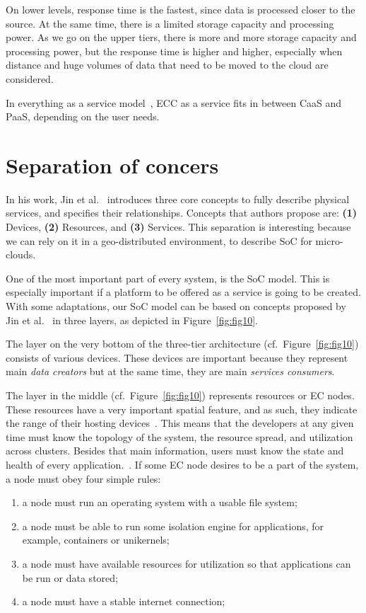 \noindent
On lower levels, response time is the fastest, since data is processed closer to the source. At the same time, there is a limited storage capacity and processing power. As we go on the upper tiers, there is more and more storage capacity and processing power, but the response time is higher and higher, especially when distance and huge volumes of data that need to be moved to the cloud are considered.

In everything as a service model~\cite{DuanFZSNH15}, ECC as a service fits in between CaaS and PaaS, depending on the user needs. 
%
%
\section{Separation of concers}\label{sec:separation_of_concerns}
%
In his work, Jin et al.~\cite{JinCJL14} introduces three core concepts to fully describe physical services, and specifies their relationships. Concepts that authors propose are: \textbf{(1)} Devices, \textbf{(2)} Resources, and \textbf{(3)} Services. This separation is interesting because we can rely on it in a geo-distributed environment, to describe SoC for micro-clouds.

One of the most important part of every system, is the SoC model. This is especially important if a platform to be offered as a service is going to be created. With some adaptations, our SoC model can be based on concepts proposed by Jin et al.~\cite{JinCJL14} in three layers, as depicted in Figure~\ref{fig:fig10}. 

The layer on the very bottom of the three-tier architecture (cf.~Figure~\ref{fig:fig10}) consists of various devices. These devices are important because they represent main \textit{data creators} but at the same time, they are main \textit{services consumers}. 

The layer in the middle (cf.~Figure~\ref{fig:fig10}) represents resources or EC nodes. These resources have a very important spatial feature, and as such, they indicate the range of their hosting devices~\cite{JinCJL14}. This means that the developers at any given time must know the topology of the system, the resource spread, and utilization across clusters. Besides that main information, users must know the state and health of every application.~\label{soc:resources}. If some EC node desires to be a part of the system, a node must obey four simple rules:

\begin{enumerate}[start=1,label={(\bfseries \arabic*)}]
\item a node must run an operating system with a usable file system;
\item a node must be able to run some isolation engine for applications, for example, containers or unikernels;
\item a node must have available resources for utilization so that applications can be run or data stored;
\item a node must have a stable internet connection;
\end{enumerate}

